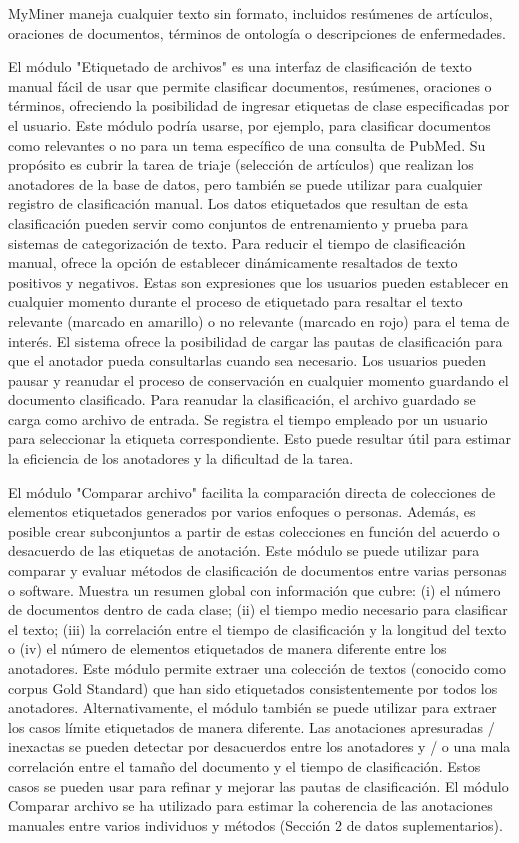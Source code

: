 MyMiner maneja cualquier texto sin formato, incluidos resúmenes de artículos, oraciones de documentos, términos de ontología o descripciones de enfermedades.

El módulo "Etiquetado de archivos" es una interfaz de clasificación de texto manual fácil de usar que permite clasificar documentos, resúmenes, oraciones o términos, ofreciendo la posibilidad de ingresar etiquetas de clase especificadas por el usuario. Este módulo podría usarse, por ejemplo, para clasificar documentos como relevantes o no para un tema específico de una consulta de PubMed. Su propósito es cubrir la tarea de triaje (selección de artículos) que realizan los anotadores de la base de datos, pero también se puede utilizar para cualquier registro de clasificación manual. Los datos etiquetados que resultan de esta clasificación pueden servir como conjuntos de entrenamiento y prueba para sistemas de categorización de texto. Para reducir el tiempo de clasificación manual, ofrece la opción de establecer dinámicamente resaltados de texto positivos y negativos. Estas son expresiones que los usuarios pueden establecer en cualquier momento durante el proceso de etiquetado para resaltar el texto relevante (marcado en amarillo) o no relevante (marcado en rojo) para el tema de interés. El sistema ofrece la posibilidad de cargar las pautas de clasificación para que el anotador pueda consultarlas cuando sea necesario. Los usuarios pueden pausar y reanudar el proceso de conservación en cualquier momento guardando el documento clasificado. Para reanudar la clasificación, el archivo guardado se carga como archivo de entrada. Se registra el tiempo empleado por un usuario para seleccionar la etiqueta correspondiente. Esto puede resultar útil para estimar la eficiencia de los anotadores y la dificultad de la tarea.

El módulo "Comparar archivo" facilita la comparación directa de colecciones de elementos etiquetados generados por varios enfoques o personas. Además, es posible crear subconjuntos a partir de estas colecciones en función del acuerdo o desacuerdo de las etiquetas de anotación. Este módulo se puede utilizar para comparar y evaluar métodos de clasificación de documentos entre varias personas o software. Muestra un resumen global con información que cubre: (i) el número de documentos dentro de cada clase; (ii) el tiempo medio necesario para clasificar el texto; (iii) la correlación entre el tiempo de clasificación y la longitud del texto o (iv) el número de elementos etiquetados de manera diferente entre los anotadores. Este módulo permite extraer una colección de textos (conocido como corpus Gold Standard) que han sido etiquetados consistentemente por todos los anotadores. Alternativamente, el módulo también se puede utilizar para extraer los casos límite etiquetados de manera diferente. Las anotaciones apresuradas / inexactas se pueden detectar por desacuerdos entre los anotadores y / o una mala correlación entre el tamaño del documento y el tiempo de clasificación. Estos casos se pueden usar para refinar y mejorar las pautas de clasificación. El módulo Comparar archivo se ha utilizado para estimar la coherencia de las anotaciones manuales entre varios individuos y métodos (Sección 2 de datos suplementarios).

